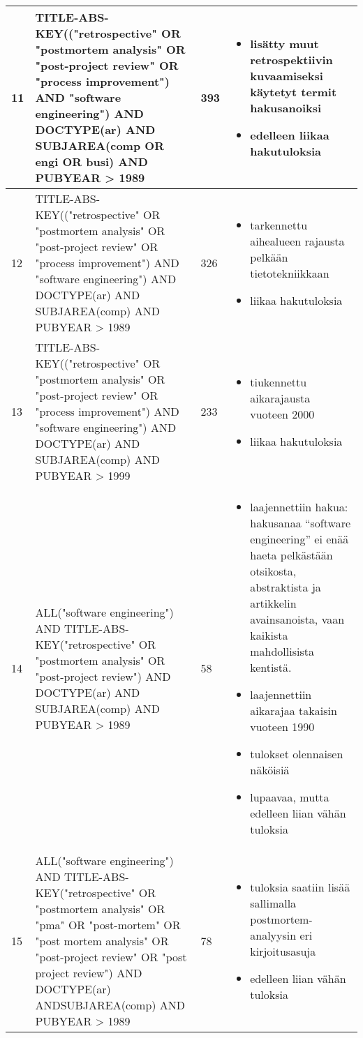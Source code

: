 \begin{center}
\begin{longtable}{|p{1cm}|p{6cm}|p{2cm}|p{7cm}|}
\hline
 11 & TITLE-ABS-KEY(("retrospective" OR "postmortem analysis" OR "post-project review" OR "process improvement") AND "software engineering") AND DOCTYPE(ar) AND SUBJAREA(comp OR engi OR busi) AND PUBYEAR > 1989 & 393 & \begin{itemize} \item lisätty muut retrospektiivin kuvaamiseksi käytetyt termit hakusanoiksi\item edelleen liikaa hakutuloksia \end{itemize} \\
\hline
 12 & TITLE-ABS-KEY(("retrospective" OR "postmortem analysis" OR "post-project review" OR "process improvement") AND "software engineering") AND DOCTYPE(ar) AND SUBJAREA(comp) AND PUBYEAR > 1989 & 326 & \begin{itemize} \item tarkennettu aihealueen rajausta pelkään tietotekniikkaan\item liikaa hakutuloksia \end{itemize} \\
\hline
 13 & TITLE-ABS-KEY(("retrospective" OR "postmortem analysis" OR "post-project review" OR "process improvement") AND "software engineering") AND DOCTYPE(ar) AND SUBJAREA(comp) AND PUBYEAR > 1999 & 233 & \begin{itemize} \item tiukennettu aikarajausta vuoteen 2000\item liikaa hakutuloksia \end{itemize} \\
\hline
 14 & ALL("software engineering") AND TITLE-ABS-KEY("retrospective" OR "postmortem analysis" OR "post-project review") AND DOCTYPE(ar) AND SUBJAREA(comp) AND PUBYEAR > 1989 & 58 & \begin{itemize} \item laajennettiin hakua: hakusanaa “software engineering” ei enää haeta pelkästään otsikosta, abstraktista ja artikkelin avainsanoista, vaan kaikista mahdollisista kentistä.\item laajennettiin aikarajaa takaisin vuoteen 1990\item tulokset olennaisen näköisiä \item lupaavaa, mutta edelleen liian vähän tuloksia \end{itemize} \\
\hline
 15 & ALL("software engineering") AND TITLE-ABS-KEY("retrospective" OR "postmortem analysis" OR "pma" OR "post-mortem" OR "post mortem analysis" OR "post-project review" OR "post project review") AND DOCTYPE(ar) ANDSUBJAREA(comp) AND PUBYEAR > 1989 & 78 & \begin{itemize} \item tuloksia saatiin lisää sallimalla postmortem-analyysin eri kirjoitusasuja\item edelleen liian vähän tuloksia \end{itemize} \\

\end{longtable}
\end{center}

